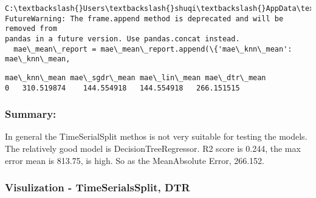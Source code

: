 \documentclass[11pt]{article}
\makeatletter
\newcommand{\boxspacing}{\kern\kvtcb@left@rule\kern\kvtcb@boxsep}
\newcommand{\prompt}[4]{
        {\ttfamily\llap{{\color{#2}[#3]:\hspace{3pt}#4}}\vspace{-\baselineskip}}
    }
\makeatother
\begin{document}
    \begin{Verbatim}[commandchars=\\\{\}]
C:\textbackslash{}Users\textbackslash{}shuqi\textbackslash{}AppData\textbackslash{}Local\textbackslash{}Temp\textbackslash{}ipykernel\_10424\textbackslash{}2850408021.py:9:
FutureWarning: The frame.append method is deprecated and will be removed from
pandas in a future version. Use pandas.concat instead.
  mae\_mean\_report = mae\_mean\_report.append(\{'mae\_knn\_mean': mae\_knn\_mean,
    \end{Verbatim}

            \begin{tcolorbox}[breakable, size=fbox, boxrule=.5pt, pad at break*=1mm, opacityfill=0]
\prompt{Out}{outcolor}{117}{\boxspacing}
\begin{Verbatim}[commandchars=\\\{\}]
  mae\_knn\_mean mae\_sgdr\_mean mae\_lin\_mean mae\_dtr\_mean
0   310.519874    144.554918   144.554918   266.151515
\end{Verbatim}
\end{tcolorbox}
        
    \hypertarget{summary}{%
\subsubsection{Summary:}\label{summary}}

In general the TimeSerialSplit methos is not very suitable for testing
the models. The relatively good model is DecisionTreeRegressor. R2 score
is 0.244, the max error mean is 813.75, is high. So as the MeanAbsolute
Error, 266.152.

    \hypertarget{visulization---timeserialssplit-dtr}{%
\subsubsection{Visulization - TimeSerialsSplit,
DTR}\label{visulization---timeserialssplit-dtr}}
\end{document}
